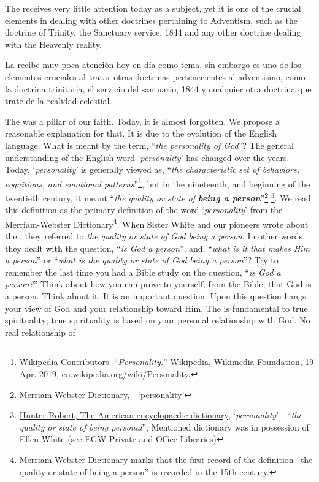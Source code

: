 The  receives very little attention today as a subject, yet it is one of the crucial elements in dealing with other doctrines pertaining to Adventism, such as the doctrine of Trinity, the Sanctuary service, 1844 and any other doctrine dealing with the Heavenly reality.


La  recibe muy poca atención hoy en día como tema, sin embargo es uno de los elementos cruciales al tratar otras doctrinas pertenecientes al adventismo, como la doctrina trinitaria, el servicio del santuario, 1844 y cualquier otra doctrina que trate de la realidad celestial.


The  was a pillar of our faith. Today, it is almost forgotten. We propose a reasonable explanation for that. It is due to the evolution of the English language. What is meant by the term, “\textit{the personality of God}”? The general understanding of the English word ‘\textit{personality}’ has changed over the years. Today, ‘\textit{personality}’ is generally viewed as, “\textit{the characteristic set of behaviors, cognitions, and emotional patterns}”\footnote{Wikipedia Contributors. “\textit{Personality.}” Wikipedia, Wikimedia Foundation, 19 Apr. 2019, \href{https://en.wikipedia.org/wiki/Personality}{en.wikipedia.org/wiki/Personality}.}, but in the nineteenth, and beginning of the twentieth century, it meant “\textit{the quality or state of \textbf{being a person}}”\footnote{\href{https://www.merriam-webster.com/dictionary/personality}{Merriam-Webster Dictionary}, - ‘personality’} \footnote{\href{https://babel.hathitrust.org/cgi/pt?id=mdp.39015050663213&view=1up&seq=780}{Hunter Robert, The American encyclopaedic dictionary}, ‘\textit{personality}’ - “\textit{the quality or state of being personal}”; Mentioned dictionary was in possession of Ellen White (see \href{https://repo.adventistdigitallibrary.org/PDFs/adl-22/adl-22251050.pdf?_ga=2.116010630.1065317374.1621993520-1506151612.1617862694&fbclid=IwAR3vwmp8jxtnpPEKv0KD9mCv8dJpmRGoyIXW0CkbQAjbU0h6YaBGqhgBzbk}{EGW Private and Office Libraries})}. We read this definition as the primary definition of the word ‘\textit{personality}’ from the Merriam-Webster Dictionary\footnote{\href{https://www.merriam-webster.com/dictionary/personality\#word-history}{Merriam-Webster Dictionary} marks that the first record of the definition “the quality or state of being a person” is recorded in the 15th century.}. When Sister White and our pioneers wrote about the , they referred to \textit{the quality or state of God being a person}. In other words, they dealt with the question, “\textit{is God a person}”, and, “\textit{what is it that makes Him a person}” or “\textit{what is the quality or state of God being a person}”? Try to remember the last time you had a Bible study on the question, “\textit{is God a person?}” Think about how you can prove to yourself, from the Bible, that God is a person. Think about it. It is an important question. Upon this question hangs your view of God and your relationship toward Him. The  is fundamental to true spirituality; true spirituality is based on your personal relationship with God. No real relationship of 